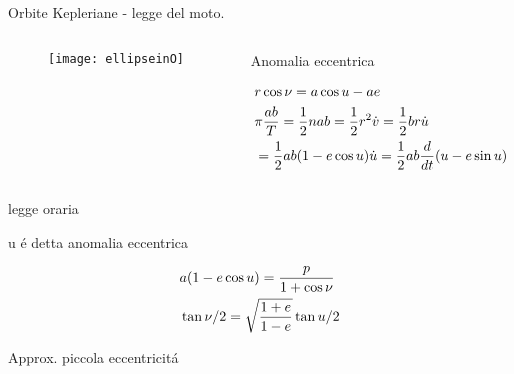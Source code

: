 \begin{frame}{Orbite Kepleriane - legge del moto.}

\begin{columns}

\begin{column}{0.2\textwidth}

\begin{figure}[!ht]

\texttt{[image: ellipseinO]}

\end{figure}



\end{column}

\begin{column}{0.8\textwidth}

\begin{block}{Anomalia eccentrica}

\begin{align*}
&r\cos{\nu}=a\cos{u}-ae\\
&\pi\frac{ab}{T}=\frac{1}{2}nab=\frac{1}{2}r^2\dot{v}=\frac{1}{2}br\dot{u}\\
&=\frac{1}{2}ab(1-e\cos{u})\dot{u}=\frac{1}{2}ab\frac{d}{d t}(u-e\sin{u})
\end{align*}

\end{block}

\end{column}

\end{columns}



\end{frame}

\begin{wordonframe}{legge oraria}

u \'e detta anomalia eccentrica

\begin{align*}
&a(1-e\cos{u})=\frac{p}{1+\cos{\nu}}\\
&\operatorname{tan}{\nu/2}=\sqrt{\frac{1+e}{1-e}}\operatorname{tan}{u/2}
\end{align*}

\end{wordonframe}

\begin{frame}{Approx. piccola eccentricit\'a}

\end{frame}

